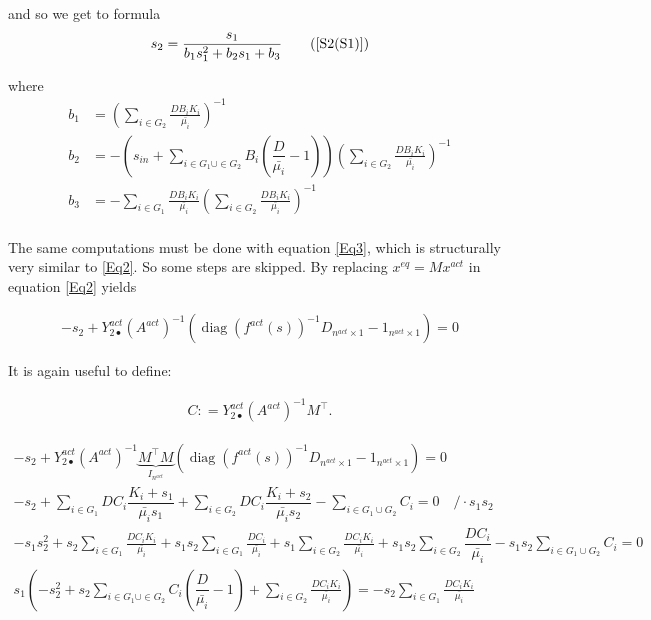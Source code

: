 \documentclass[processes,article,submit,moreauthors,pdftex]{Definitions/mdpi}
\DeclareMathOperator{\diag}{diag}
\begin{document}
and so we get to formula
\begin{align}
s_2 = \frac{s_1}{b_1s_1^2+b_2s_1+b_3} \tag{\ref{S2(S1)}}
\end{align}

where
\begin{align}
\displaystyle b_1 & =  \left(\sum \limits_{i \in G_2 } \frac{DB_iK_i}{\bar{\mu_i}} \right)^{-1} \\
\displaystyle b_2 & = -\left(s_{in}+\sum \limits_{i \in G_1 \cup \in G_2 } B_i\left(\dfrac{D}{\bar{\mu_i}}-1\right) \right) \left(\sum \limits_{i \in G_2 } \frac{DB_iK_i}{\bar{\mu_i}} \right)^{-1} \\
\displaystyle b_3 & = -\sum \limits_{i \in G_1} \frac{DB_iK_i}{\bar{\mu_i}} \left(\sum \limits_{i \in G_2 } \frac{DB_iK_i}{\bar{\mu_i}} \right)^{-1} \\
\end{align} 

The same computations must be done with equation \eqref{Eq3}, which is structurally very similar to \eqref{Eq2}. So some steps are skipped. By replacing $x^{eq} = Mx^{act}$ in equation \eqref{Eq2} yields

\begin{align}
\label{s2Equilibria} -s_2 + Y^{act}_{2\bullet}(A^{act})^{-1}(\diag(f^{act}(s))^{-1}D_{n^{act}\times 1} - 1_{n^{act}\times 1}) = 0
\end{align}

It is again useful to define:

\begin{align}
C: = Y^{act}_{2\bullet} (A^{act})^{-1}M^\top.
\end{align}

\begin{align}
-s_2 + Y^{act}_{2\bullet}(A^{act})^{-1}\underbrace{M^\top M}_{I_{n^{act}}}(\diag(f^{act}(s))^{-1} D_{n^{act}\times 1} - 1_{n^{act}\times 1}) = 0\\
- s_2 + \sum \limits_{i \in G_1 } DC_i \dfrac{K_i+s_1}{\bar{\mu_i}s_1}+ \sum \limits_{i \in G_2 } DC_i \dfrac{K_i+s_2}{\bar{\mu_i}s_2} - \sum \limits_{i \in G_1 \cup G_2}C_i= 0 \quad /\cdot s_1s_2
\\
\displaystyle- s_1s_2^2 + s_2\sum \limits_{i \in G_1 } \frac{DC_iK_i}{\bar{\mu_i}}+s_1s_2\sum \limits_{i \in G_1 } \frac{DC_i}{\bar{\mu_i}}+ s_1\sum \limits_{i \in G_2 } \frac{DC_iK_i}{\bar{\mu_i}} + s_1s_2\sum \limits_{i \in G_2 } \dfrac{DC_i}{\bar{\mu_i}} - s_1s_2\sum \limits_{i \in G_1 \cup G_2}C_i= 0 \\
\displaystyle s_1\left( - s^2_2 +s_2\sum \limits_{i \in G_1 \cup \in G_2 } C_i\left(\dfrac{D}{\bar{\mu_i}}-1\right)  + \sum \limits_{i \in G_2} \frac{DC_iK_i}{\bar{\mu_i}}\right) = - s_2\sum \limits_{i \in G_1 } \frac{DC_iK_i}{\bar{\mu_i}}
\end{align}
\end{document}
